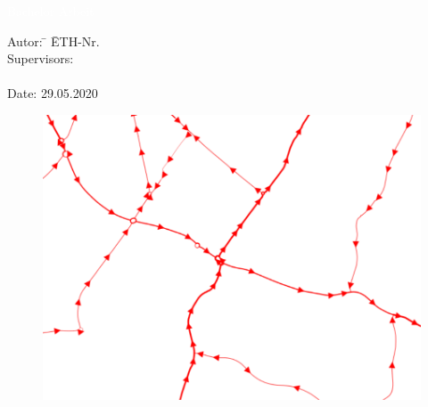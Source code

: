 %
%
%
%


\begin{titlepage}


{
\vspace{5mm}
{\Huge\textcolor{white}{Bachelor Arbeit}}\\[4mm]
{\Huge\textcolor{white}{\textbf{\mytitle}}}

{\color{white} 
\begin{tabbing}
Autor: \hspace{20mm} \= \myauthor \hspace{20mm} \= ETH-Nr. \myethnr \\[3mm]
Supervisors: \> \myprofessor\\[1mm]
\> \mysupervisor\\[3mm]
Date: 29.05.2020
\end{tabbing}
}
}
\vspace{20mm}

\begin{figure}[h!]
	\centering
	\includegraphics[width=\textwidth]{figures/f-01-02-Titelbild-GIS}
\end{figure}





\end{titlepage}


%

